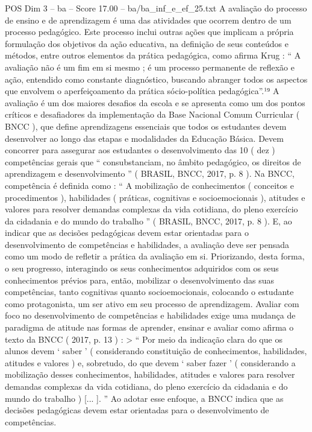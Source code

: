 \begin{textsample}{POS Dim 3 – ba – Score 17.00 – ba/ba\_inf\_e\_ef\_25.txt}
A avaliação do processo de ensino e de aprendizagem é uma das atividades que ocorrem dentro de um processo pedagógico.
Este processo inclui outras ações que implicam a própria formulação dos objetivos da ação educativa, na definição de seus conteúdos e métodos, entre outros elementos da prática pedagógica, como afirma Krug : “ A avaliação não é um fim em si mesmo ; é um processo permanente de reflexão e ação, entendido como constante diagnóstico, buscando abranger todos os aspectos que envolvem o aperfeiçoamento da prática sócio-política pedagógica”.¹⁹ A avaliação é um dos maiores desafios da escola e se apresenta como um dos pontos críticos e desafiadores da implementação da Base Nacional Comum Curricular ( BNCC ), que define aprendizagens essenciais que todos os estudantes devem desenvolver ao longo das etapas e modalidades da Educação Básica.
Devem concorrer para assegurar aos estudantes o desenvolvimento das 10 ( dez ) competências gerais que “ consubstanciam, no âmbito pedagógico, os direitos de aprendizagem e desenvolvimento ” ( BRASIL, BNCC, 2017, p. 8 ).
Na BNCC, competência é definida como : “ A mobilização de conhecimentos ( conceitos e procedimentos ), habilidades ( práticas, cognitivas e socioemocionais ), atitudes e valores para resolver demandas complexas da vida cotidiana, do pleno exercício da cidadania e do mundo do trabalho ” ( BRASIL, BNCC, 2017, p. 8 ).
E, ao indicar que as decisões pedagógicas devem estar orientadas para o desenvolvimento de competências e habilidades, a avaliação deve ser pensada como um modo de refletir a prática da avaliação em si.
Priorizando, desta forma, o seu progresso, interagindo os seus conhecimentos adquiridos com os seus conhecimentos prévios para, então, mobilizar o desenvolvimento das suas competências, tanto cognitivas quanto socioemocionais, colocando o estudante como protagonista, um ser ativo em seu processo de aprendizagem.
Avaliar com foco no desenvolvimento de competências e habilidades exige uma mudança de paradigma de atitude nas formas de aprender, ensinar e avaliar como afirma o texto da BNCC ( 2017, p. 13 ) : > “ Por meio da indicação clara do que os alunos devem ‘ saber ’ ( considerando constituição de conhecimentos, habilidades, atitudes e valores ) e, sobretudo, do que devem ‘ saber fazer ’ ( considerando a mobilização desses conhecimentos, habilidades, atitudes e valores para resolver demandas complexas da vida cotidiana, do pleno exercício da cidadania e do mundo do trabalho ) [... ]. ” Ao adotar esse enfoque, a BNCC indica que as decisões pedagógicas devem estar orientadas para o desenvolvimento de competências.

\end{textsample}
